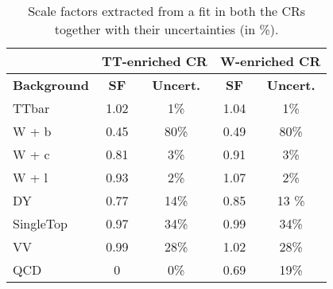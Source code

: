 \documentclass[10pt]{article}
\begin{document}
\begin{table}[!ht]
\begin{center}
\begin{tabular}{|l|c|c||c|c|}
\hline
\hline
& \multicolumn{2}{c|}{\textbf{TT-enriched CR }} & \multicolumn{2}{c|}{\textbf{W-enriched CR}} \\
\hline
\hline
\textbf{Background} & \textbf{SF} & \textbf{Uncert.} & \textbf{SF} & \textbf{Uncert.}\\
\hline
TTbar                       & 1.02 & 1\%    & 1.04 & 1\%  \\
\hline
W + b                       & 0.45 & 80\%   & 0.49 & 80\% \\
W + c                       & 0.81 & 3\%    & 0.91 & 3\%  \\
W + l                       & 0.93 & 2\%    & 1.07 & 2\%  \\
\hline
DY                          & 0.77 & 14\%   & 0.85 & 13 \%\\
\hline
SingleTop                   & 0.97 & 34\%   & 0.99 & 34\% \\
\hline
VV                          & 0.99 & 28\%   & 1.02 & 28\% \\
\hline
QCD                         & 0    & 0\%    & 0.69 & 19\% \\
\hline
\hline
\end{tabular}
\caption{Scale factors extracted from a fit in both the CRs together with their uncertainties (in \%).}
\label{tab:SFtable}
\end{center}
\end{table} 
\end{document}
